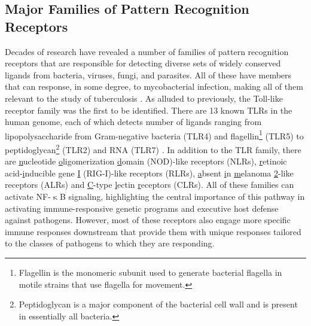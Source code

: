 \subsection{Major Families of Pattern Recognition Receptors}\label{prrs}

Decades of research have revealed a number of families of pattern recognition receptors that are responsible for detecting diverse sets of widely conserved ligands from bacteria, viruses, fungi, and parasites. All of these have members that can response, in some degree, to mycobacterial infection, making all of them relevant to the study of tuberculosis \citep{Ishikawa2017}. As alluded to previously, the Toll\hyp{}like receptor family was the first to be identified. There are 13 known TLRs in the human genome, each of which detects number of ligands ranging from lipopolysaccharide from Gram\hyp{}negative bacteria (TLR4) and flagellin\footnote{Flagellin is the monomeric subunit used to generate bacterial flagella in motile strains that use flagella for movement.} (TLR5) to peptidoglycan\footnote{Peptidoglycan is a major component of the bacterial cell wall and is present in essentially all bacteria.} (TLR2) and RNA (TLR7) \citep{Kawai2007}. In addition to the TLR family, there are \underline{n}ucleotide \underline{o}ligomerization \underline{d}omain (NOD)\hyp{}like receptors (NLRs), \underline{r}etinoic acid\hyp{}\underline{i}nducible \underline{g}ene \underline{I} (RIG\hyp{}I)\hyp{}like receptors (RLRs), \underline{a}bsent \underline{i}n \underline{m}elanoma \underline{2}\hyp{}like receptors (ALRs) and \underline{C}\hyp{}type \underline{l}ectin \underline{r}eceptors (CLRs). All of these families can activate NF\hyp{}$\upkappa$B signaling, highlighting the central importance of this pathway in activating immune\hyp{}responsive genetic programs and executive host defense against pathogens. However, most of these receptors also engage more specific immune responses downstream that provide them with unique responses tailored to the classes of pathogens to which they are responding.

